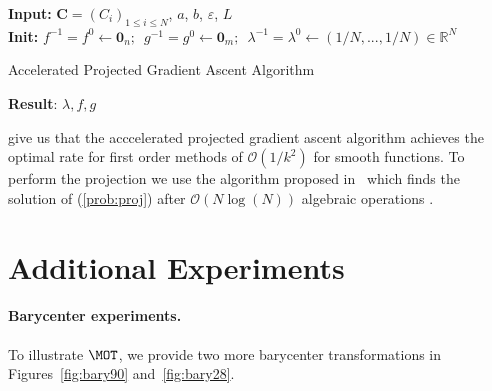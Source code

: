 \begin{algorithm}[H]\label{algo:Proj-grad}
\SetAlgoLined
\textbf{Input:} $\mathbf{C}=(C_i)_{1\leq i\leq N}$, $a$, $b$, $\varepsilon$, $L$\\
\textbf{Init:} $f^{-1}=f^0 \leftarrow \mathbf{0}_n\text{;  }$ $g^{-1} = g^0 \leftarrow \mathbf{0}_m\text{;  }$ $\lambda^{-1} = \lambda^0 \leftarrow (1/N,...,1/N)\in\mathbb{R}^N$\\
\caption{Accelerated Projected Gradient Ascent Algorithm}
\textbf{Result}: $\lambda,f,g$
\end{algorithm}

\cite{beck2009fast,tseng2008accelerated} give us that the acccelerated projected gradient ascent algorithm achieves the optimal rate for first order methods of $\mathcal{O}(1/k^2)$ for smooth functions. To perform the projection we use the algorithm proposed in~\cite{shalev2006efficient} which finds the solution of (\ref{prob:proj}) after $\mathcal{O}(N\log(N))$ algebraic operations \citep{wang2013projection}.


\section{Additional Experiments}
\label{sec:addexp}
\paragraph{Barycenter experiments.} To illustrate $\MOT$, we provide two more barycenter transformations in Figures~\ref{fig:bary90} and~\ref{fig:bary28}.

